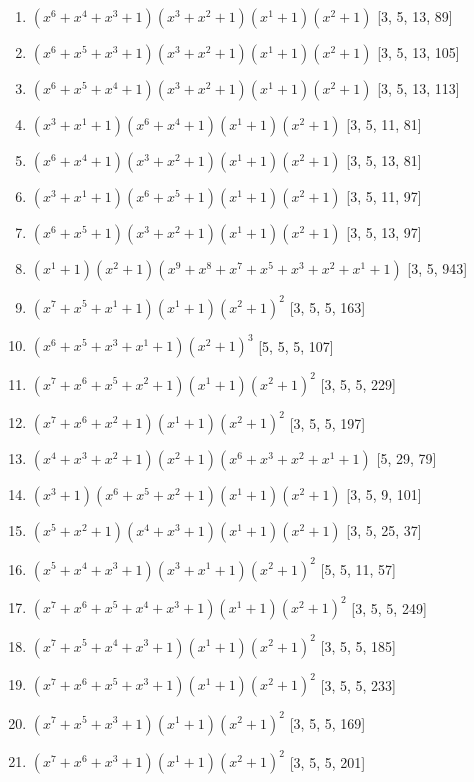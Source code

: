 \documentclass[10pt,twocolumn]{article}
\begin{document}
\begin{enumerate}
\item $(x^{6} + x^{4} + x^{3} + 1)(x^{3} + x^{2} + 1)(x^{1} + 1)(x^{2} + 1)$  [3, 5, 13, 89]
\item $(x^{6} + x^{5} + x^{3} + 1)(x^{3} + x^{2} + 1)(x^{1} + 1)(x^{2} + 1)$  [3, 5, 13, 105]
\item $(x^{6} + x^{5} + x^{4} + 1)(x^{3} + x^{2} + 1)(x^{1} + 1)(x^{2} + 1)$  [3, 5, 13, 113]
\item $(x^{3} + x^{1} + 1)(x^{6} + x^{4} + 1)(x^{1} + 1)(x^{2} + 1)$  [3, 5, 11, 81]
\item $(x^{6} + x^{4} + 1)(x^{3} + x^{2} + 1)(x^{1} + 1)(x^{2} + 1)$  [3, 5, 13, 81]
\item $(x^{3} + x^{1} + 1)(x^{6} + x^{5} + 1)(x^{1} + 1)(x^{2} + 1)$  [3, 5, 11, 97]
\item $(x^{6} + x^{5} + 1)(x^{3} + x^{2} + 1)(x^{1} + 1)(x^{2} + 1)$  [3, 5, 13, 97]
\item $(x^{1} + 1)(x^{2} + 1)(x^{9} + x^{8} + x^{7} + x^{5} + x^{3} + x^{2} + x^{1} + 1)$  [3, 5, 943]
\item $(x^{7} + x^{5} + x^{1} + 1)(x^{1} + 1)(x^{2} + 1)^{2}$  [3, 5, 5, 163]
\item $(x^{6} + x^{5} + x^{3} + x^{1} + 1)(x^{2} + 1)^{3}$  [5, 5, 5, 107]
\item $(x^{7} + x^{6} + x^{5} + x^{2} + 1)(x^{1} + 1)(x^{2} + 1)^{2}$  [3, 5, 5, 229]
\item $(x^{7} + x^{6} + x^{2} + 1)(x^{1} + 1)(x^{2} + 1)^{2}$  [3, 5, 5, 197]
\item $(x^{4} + x^{3} + x^{2} + 1)(x^{2} + 1)(x^{6} + x^{3} + x^{2} + x^{1} + 1)$  [5, 29, 79]
\item $(x^{3} + 1)(x^{6} + x^{5} + x^{2} + 1)(x^{1} + 1)(x^{2} + 1)$  [3, 5, 9, 101]
\item $(x^{5} + x^{2} + 1)(x^{4} + x^{3} + 1)(x^{1} + 1)(x^{2} + 1)$  [3, 5, 25, 37]
\item $(x^{5} + x^{4} + x^{3} + 1)(x^{3} + x^{1} + 1)(x^{2} + 1)^{2}$  [5, 5, 11, 57]
\item $(x^{7} + x^{6} + x^{5} + x^{4} + x^{3} + 1)(x^{1} + 1)(x^{2} + 1)^{2}$  [3, 5, 5, 249]
\item $(x^{7} + x^{5} + x^{4} + x^{3} + 1)(x^{1} + 1)(x^{2} + 1)^{2}$  [3, 5, 5, 185]
\item $(x^{7} + x^{6} + x^{5} + x^{3} + 1)(x^{1} + 1)(x^{2} + 1)^{2}$  [3, 5, 5, 233]
\item $(x^{7} + x^{5} + x^{3} + 1)(x^{1} + 1)(x^{2} + 1)^{2}$  [3, 5, 5, 169]
\item $(x^{7} + x^{6} + x^{3} + 1)(x^{1} + 1)(x^{2} + 1)^{2}$  [3, 5, 5, 201]

\end{enumerate}
\end{document}

